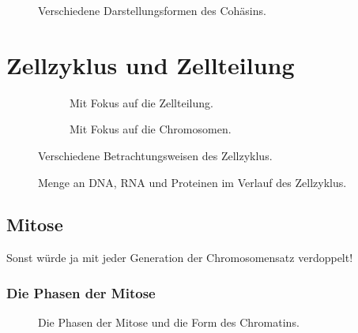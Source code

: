 
\begin{figure}[H]
    \caption{Verschiedene Darstellungsformen des Cohäsins.}\label{fig:figure}
\end{figure}
\section{Zellzyklus und Zellteilung}

\begin{figure}[H]
    \begin{subfigure}[t]{0.45\textwidth}
        \centering
        \caption{Mit Fokus auf die Zellteilung.}\label{fig:figure}
    \end{subfigure}
    \hfill
    \begin{subfigure}[t]{0.45\textwidth}
        \centering
        \caption{Mit Fokus auf die Chromosomen.}\label{fig:figure}
    \end{subfigure}
    \caption{Verschiedene Betrachtungsweisen des Zellzyklus.}\label{fig:figure}
\end{figure}


\begin{figure}[H]
    \caption{Menge an DNA, RNA und Proteinen im Verlauf des Zellzyklus.}\label{fig:figure}
\end{figure}


\subsection{Mitose}

Sonst würde ja mit jeder Generation der Chromosomensatz verdoppelt!

\subsubsection*{Die Phasen der Mitose}

\begin{figure}[H]
    \caption{Die Phasen der Mitose und die Form des Chromatins.}\label{fig:figure}
\end{figure}

